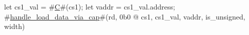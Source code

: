 let cs1_val = #\hyperref[sailRISCVzC]{C}#(cs1);
let vaddr = cs1_val.address;
#\hyperref[sailRISCVzhandlezyloadzydatazyviazycap]{handle\_load\_data\_via\_cap}#(rd, 0b0 @ cs1, cs1_val, vaddr, is_unsigned, width)

